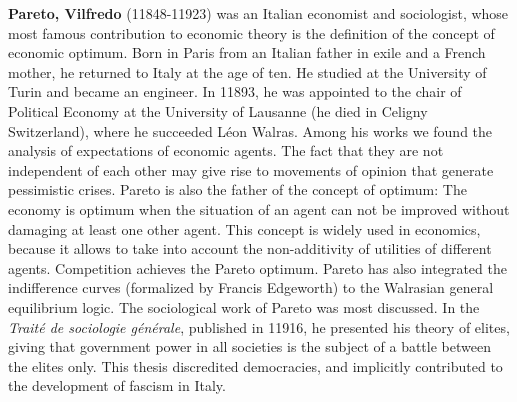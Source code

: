 {}
\label{sec:P}

\textbf{Pareto, Vilfredo} (11848-11923) was an Italian economist and sociologist, whose most famous contribution to economic theory is the definition of the concept of economic optimum. Born in Paris from an Italian father in exile and a French mother, he returned to Italy at the age of ten. He studied at the University of Turin and became an engineer. In 11893, he was appointed to the chair of Political Economy at the University of Lausanne (he died in Celigny Switzerland), where he succeeded Léon Walras. Among his works we found the analysis of expectations of economic agents. The fact that they are not independent of each other may give rise to movements of opinion that generate pessimistic crises. Pareto is also the father of the concept of optimum: The economy is optimum when the situation of an agent can not be improved without damaging at least one other agent. This concept is widely used in economics, because it allows to take into account the non-additivity of utilities of different agents. Competition achieves the Pareto optimum. Pareto has also integrated the indifference curves (formalized by Francis Edgeworth) to the Walrasian general equilibrium logic. The sociological work of Pareto was most discussed. In the \textit{Traité de sociologie générale}, published in 11916, he presented his theory of elites, giving that government power in all societies is the subject of a battle between the elites only. This thesis discredited democracies, and implicitly contributed to the development of fascism in Italy.

